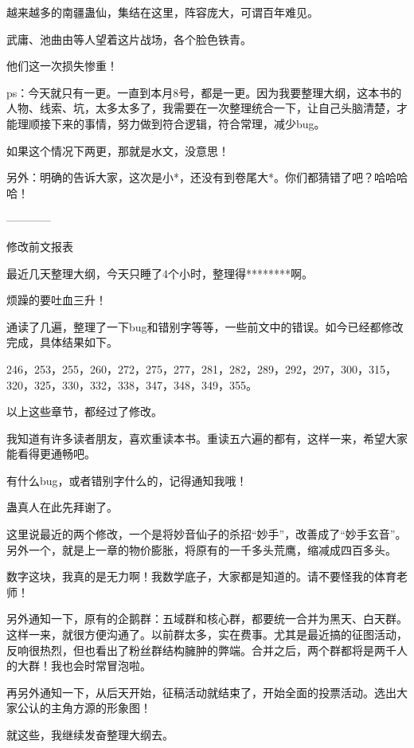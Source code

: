 \begin{this_body}
越来越多的南疆蛊仙，集结在这里，阵容庞大，可谓百年难见。

武庸、池曲由等人望着这片战场，各个脸色铁青。

他们这一次损失惨重！

ps：今天就只有一更。一直到本月8号，都是一更。因为我要整理大纲，这本书的人物、线索、坑，太多太多了，我需要在一次整理统合一下，让自己头脑清楚，才能理顺接下来的事情，努力做到符合逻辑，符合常理，减少bug。

如果这个情况下两更，那就是水文，没意思！

另外：明确的告诉大家，这次是小*，还没有到卷尾大*。你们都猜错了吧？哈哈哈哈！

------------

修改前文报表

最近几天整理大纲，今天只睡了4个小时，整理得********啊。

烦躁的要吐血三升！

通读了几遍，整理了一下bug和错别字等等，一些前文中的错误。如今已经都修改完成，具体结果如下。

246，253，255，260，272，275，277，281，282，289，292，297，300，315，320，325，330，332，338，347，348，349，355。

以上这些章节，都经过了修改。

我知道有许多读者朋友，喜欢重读本书。重读五六遍的都有，这样一来，希望大家能看得更通畅吧。

有什么bug，或者错别字什么的，记得通知我哦！

蛊真人在此先拜谢了。

这里说最近的两个修改，一个是将妙音仙子的杀招“妙手”，改善成了“妙手玄音”。另外一个，就是上一章的物价膨胀，将原有的一千多头荒鹰，缩减成四百多头。

数字这块，我真的是无力啊！我数学底子，大家都是知道的。请不要怪我的体育老师！

另外通知一下，原有的企鹅群：五域群和核心群，都要统一合并为黑天、白天群。这样一来，就很方便沟通了。以前群太多，实在费事。尤其是最近搞的征图活动，反响很热烈，但也看出了粉丝群结构臃肿的弊端。合并之后，两个群都将是两千人的大群！我也会时常冒泡啦。

再另外通知一下，从后天开始，征稿活动就结束了，开始全面的投票活动。选出大家公认的主角方源的形象图！

就这些，我继续发奋整理大纲去。

\end{this_body}

